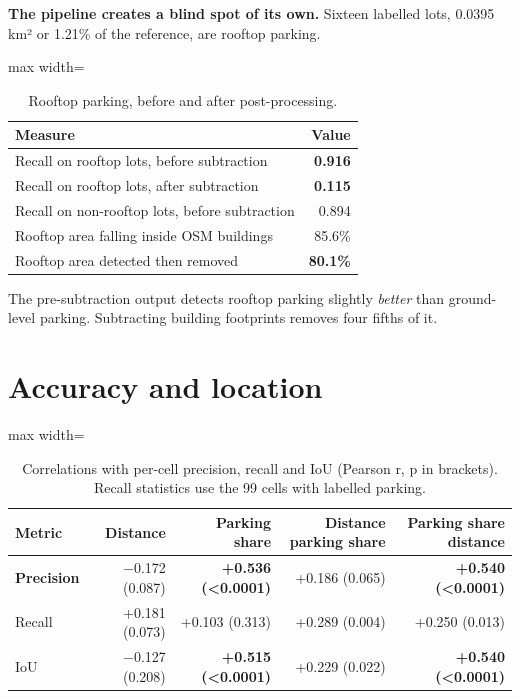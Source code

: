 \textbf{The pipeline creates a blind spot of its own.} Sixteen labelled lots, 0.0395 km² or 1.21\% of the reference, are rooftop parking.

\begin{table}[htbp]
\centering
\caption{Rooftop parking, before and after post-processing.}\label{tab:4.6}
\begin{adjustbox}{max width=\textwidth}
\begin{tabular}{@{}lr@{}}
\toprule
Measure & Value \\
\midrule
Recall on rooftop lots, before subtraction & \textbf{0.916} \\
Recall on rooftop lots, after subtraction & \textbf{0.115} \\
Recall on non-rooftop lots, before subtraction & 0.894 \\
Rooftop area falling inside OSM buildings & 85.6\% \\
Rooftop area detected then removed & \textbf{80.1\%} \\
\bottomrule
\end{tabular}
\end{adjustbox}
\end{table}
\restoreparskip

The pre-subtraction output detects rooftop parking slightly \emph{better} than ground-level parking. Subtracting building footprints removes four fifths of it.

\hypertarget{accuracy-and-location}{%
\section{Accuracy and location}\label{accuracy-and-location}}

\begin{table}[htbp]
\centering
\caption{Correlations with per-cell precision, recall and IoU (Pearson r, p in brackets). Recall statistics use the 99 cells with labelled parking.}\label{tab:4.7}
\begin{adjustbox}{max width=\textwidth}
\begin{tabular}{@{}lrrrr@{}}
\toprule
Metric & Distance & Parking share & Distance \textbar{} parking share & Parking share \textbar{} distance \\
\midrule
\textbf{Precision} & −0.172 (0.087) & \textbf{+0.536 (\textless0.0001)} & +0.186 (0.065) & \textbf{+0.540 (\textless0.0001)} \\
Recall & +0.181 (0.073) & +0.103 (0.313) & +0.289 (0.004) & +0.250 (0.013) \\
IoU & −0.127 (0.208) & \textbf{+0.515 (\textless0.0001)} & +0.229 (0.022) & \textbf{+0.540 (\textless0.0001)} \\
\bottomrule
\end{tabular}
\end{adjustbox}
\end{table}
\restoreparskip

